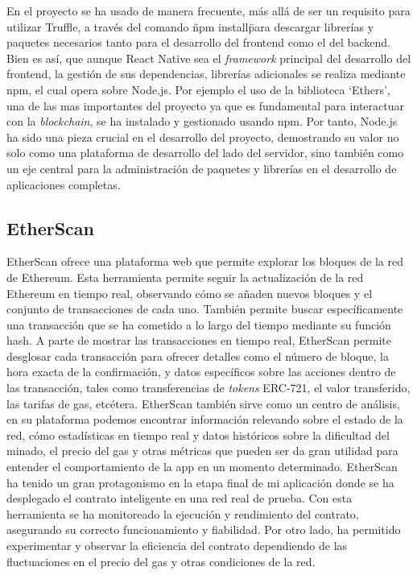 En el proyecto se ha usado de manera frecuente, más allá de ser un requisito para utilizar Truffle, a través del comando \"npm install\" para descargar librerías y paquetes necesarios tanto para el desarrollo del frontend como el del backend.
Bien es así, que aunque React Native sea el \textit{framework} principal del desarrollo del frontend, la gestión de sus dependencias, librerías adicionales se realiza mediante npm, el cual opera sobre Node.js.
Por ejemplo el uso de la biblioteca `Ethers', una de las mas importantes del proyecto ya que es fundamental para interactuar con la \textit{blockchain}, se ha instalado y gestionado usando npm.
Por tanto, Node.js ha sido una pieza crucial en el desarrollo del proyecto, demostrando su valor no solo como una plataforma de desarrollo del lado del servidor, sino también como un eje central para la administración de paquetes y librerías en el desarrollo de aplicaciones completas.


\subsection{EtherScan}

EtherScan ofrece una plataforma web que permite explorar los bloques de la red de Ethereum.
Esta herramienta permite seguir la actualización de la red Ethereum en tiempo real, observando cómo se añaden nuevos bloques y el conjunto de transacciones de cada uno. También permite buscar específicamente una transacción que se ha cometido a lo largo del tiempo mediante su función hash.
A parte de mostrar las transacciones en tiempo real, EtherScan permite desglosar cada transacción para ofrecer detalles como el número de bloque, la hora exacta de la confirmación, y datos específicos sobre las acciones dentro de las transacción, tales como transferencias de \textit{tokens} ERC-721, el valor transferido, las tarifas de gas, etcétera.
EtherScan también sirve como un centro de análisis, en su plataforma podemos encontrar información relevando sobre el estado de la red, cómo estadísticas en tiempo real y datos históricos sobre la dificultad del minado, el precio del gas y otras métricas que pueden ser da gran utilidad para entender el comportamiento de la app en un momento determinado.
EtherScan ha tenido un gran protagonismo en la etapa final de mi aplicación donde se ha desplegado el contrato inteligente en una red real de prueba.
Con esta herramienta se ha monitoreado la ejecución y rendimiento del contrato, asegurando su correcto funcionamiento y fiabilidad.
Por otro lado, ha permitido experimentar y observar la eficiencia del contrato dependiendo de las fluctuaciones en el precio del gas y otras condiciones de la red.



